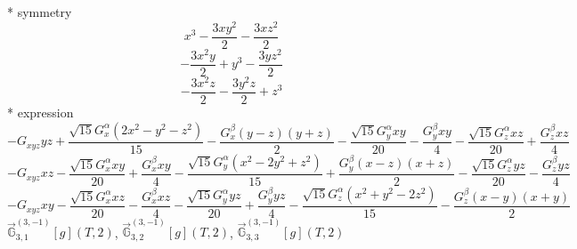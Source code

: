 \documentclass[fleqn,8pt]{jsarticle}
\begin{document}
\noindent\quad ** symmetry
\begin{dmath*}
x^{3} - \frac{3 x y^{2}}{2} - \frac{3 x z^{2}}{2}
\end{dmath*}
\begin{dmath*}
- \frac{3 x^{2} y}{2} + y^{3} - \frac{3 y z^{2}}{2}
\end{dmath*}
\begin{dmath*}
- \frac{3 x^{2} z}{2} - \frac{3 y^{2} z}{2} + z^{3}
\end{dmath*}
\noindent\quad ** expression
\begin{dmath*}
- G_{xyz} y z + \frac{\sqrt{15} G_{x}^{\alpha} \left(2 x^{2} - y^{2} - z^{2}\right)}{15} - \frac{G_{x}^{\beta} \left(y - z\right) \left(y + z\right)}{2} - \frac{\sqrt{15} G_{y}^{\alpha} x y}{20} - \frac{G_{y}^{\beta} x y}{4} - \frac{\sqrt{15} G_{z}^{\alpha} x z}{20} + \frac{G_{z}^{\beta} x z}{4}
\end{dmath*}
\begin{dmath*}
- G_{xyz} x z - \frac{\sqrt{15} G_{x}^{\alpha} x y}{20} + \frac{G_{x}^{\beta} x y}{4} - \frac{\sqrt{15} G_{y}^{\alpha} \left(x^{2} - 2 y^{2} + z^{2}\right)}{15} + \frac{G_{y}^{\beta} \left(x - z\right) \left(x + z\right)}{2} - \frac{\sqrt{15} G_{z}^{\alpha} y z}{20} - \frac{G_{z}^{\beta} y z}{4}
\end{dmath*}
\begin{dmath*}
- G_{xyz} x y - \frac{\sqrt{15} G_{x}^{\alpha} x z}{20} - \frac{G_{x}^{\beta} x z}{4} - \frac{\sqrt{15} G_{y}^{\alpha} y z}{20} + \frac{G_{y}^{\beta} y z}{4} - \frac{\sqrt{15} G_{z}^{\alpha} \left(x^{2} + y^{2} - 2 z^{2}\right)}{15} - \frac{G_{z}^{\beta} \left(x - y\right) \left(x + y\right)}{2}
\end{dmath*}
\noindent\quad $\vec{\mathbb{G}}_{3,1}^{(3,-1)}[g](T,2)$, $\vec{\mathbb{G}}_{3,2}^{(3,-1)}[g](T,2)$, $\vec{\mathbb{G}}_{3,3}^{(3,-1)}[g](T,2)$
\end{document}
